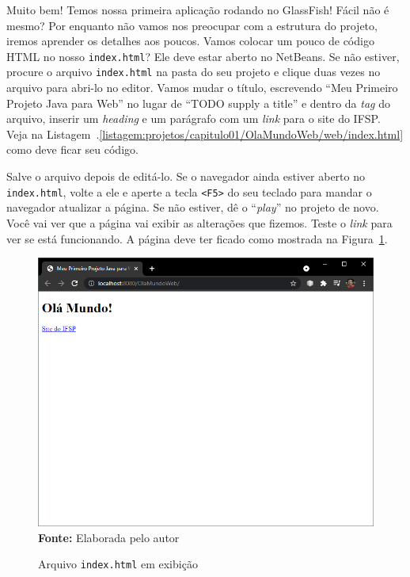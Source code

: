 Muito bem! Temos nossa primeira aplicação rodando no GlassFish! Fácil não é mesmo? Por enquanto não vamos nos preocupar com a estrutura do projeto, iremos aprender os detalhes aos poucos. Vamos colocar um pouco de código HTML no nosso \texttt{index.html}? Ele deve estar aberto no NetBeans. Se não estiver, procure o arquivo \texttt{index.html} na pasta  do seu projeto e clique duas vezes no arquivo para abri-lo no editor. Vamos mudar o título, escrevendo ``Meu Primeiro Projeto Java para Web'' no lugar de ``TODO supply a title'' e dentro da \textit{tag}  do arquivo, inserir um \textit{heading}  e um parágrafo com um \textit{link} para o site do IFSP. Veja na Listagem~\thechapter.\ref{listagem:projetos/capitulo01/OlaMundoWeb/web/index.html} como deve ficar seu código.


Salve o arquivo depois de editá-lo. Se o navegador ainda estiver aberto no \texttt{index.html}, volte a ele e aperte a tecla \texttt{<F5>} do seu teclado para mandar o navegador atualizar a página. Se não estiver, dê o ``\textit{play}'' no projeto de novo. Você vai ver que a página vai exibir as alterações que fizemos. Teste o \textit{link} para ver se está funcionando. A página deve ter ficado como mostrada na Figura~\ref{fig:cap01OlaMundoIndex}.

\FloatBarrier
\begin{figure}[!htbp]
    \centering
    \caption{Arquivo \texttt{index.html} em exibição}
    \includegraphics[scale=0.7]{imagens/cap01OlaMundoIndex}
    \\\textbf{Fonte:} Elaborada pelo autor
    \label{fig:cap01OlaMundoIndex}
\end{figure}
\FloatBarrier

